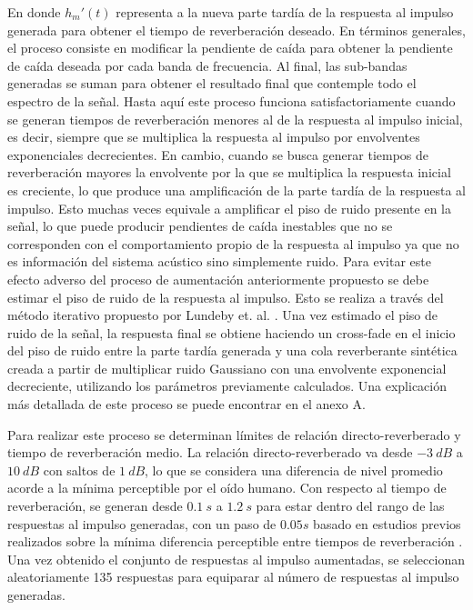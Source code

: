 En donde ${h_{m}}'(t)$ representa a la nueva parte tardía de la respuesta al impulso generada para obtener el tiempo de reverberación deseado. En términos generales, el proceso consiste en modificar la pendiente de caída para obtener la pendiente de caída deseada por cada banda de frecuencia. Al final, las sub-bandas generadas se suman para obtener el resultado final que contemple todo el espectro de la señal. Hasta aquí este proceso funciona satisfactoriamente cuando se generan tiempos de reverberación menores al de la respuesta al impulso inicial, es decir, siempre que se multiplica la respuesta al impulso por envolventes exponenciales decrecientes. En cambio, cuando se busca generar tiempos de reverberación mayores la envolvente por la que se multiplica la respuesta inicial es creciente, lo que produce una amplificación de la parte tardía de la respuesta al impulso. Esto muchas veces equivale a amplificar el piso de ruido presente en la señal, lo que puede producir pendientes de caída inestables que no se corresponden con el comportamiento propio de la respuesta al impulso ya que no es información del sistema acústico sino simplemente ruido. Para evitar este efecto adverso del proceso de aumentación anteriormente propuesto se debe estimar el piso de ruido de la respuesta al impulso. Esto se realiza a través del método iterativo propuesto por Lundeby et. al. \cite{Lundeby}. Una vez estimado el piso de ruido de la señal, la respuesta final se obtiene haciendo un cross-fade en el inicio del piso de ruido entre la parte tardía generada y una cola reverberante sintética creada a partir de multiplicar ruido Gaussiano con una envolvente exponencial decreciente, utilizando los parámetros previamente calculados. Una explicación más detallada de este proceso se puede encontrar en el anexo A. 

Para realizar este proceso se determinan límites de relación directo-reverberado y tiempo de reverberación medio. La relación directo-reverberado va desde $-3 \ dB$ a $10 \ dB$ con saltos de $1 \ dB$, lo que se considera una diferencia de nivel promedio acorde a la mínima perceptible por el oído humano. Con respecto al tiempo de reverberación, se generan desde $0.1 \ s$ a $1.2 \ s$ para estar dentro del rango de las respuestas al impulso generadas, con un paso de $0.05 s$ basado en estudios previos realizados sobre la mínima diferencia perceptible entre tiempos de reverberación \cite{aug_JND}. Una vez obtenido el conjunto de respuestas al impulso aumentadas, se seleccionan aleatoriamente 135 respuestas para equiparar al número de respuestas al impulso generadas. 

